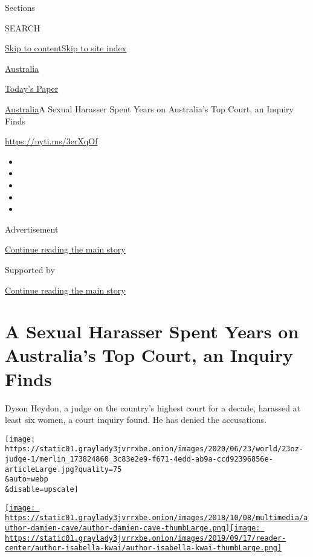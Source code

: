 Sections

SEARCH

\protect\hyperlink{site-content}{Skip to
content}\protect\hyperlink{site-index}{Skip to site index}

\href{https://www.nytimes3xbfgragh.onion/section/world/australia}{Australia}

\href{https://myaccount.nytimes3xbfgragh.onion/auth/login?response_type=cookie\&client_id=vi}{}

\href{https://www.nytimes3xbfgragh.onion/section/todayspaper}{Today's
Paper}

\href{/section/world/australia}{Australia}\textbar{}A Sexual Harasser
Spent Years on Australia's Top Court, an Inquiry Finds

\url{https://nyti.ms/3erXqOf}

\begin{itemize}
\item
\item
\item
\item
\item
\end{itemize}

Advertisement

\protect\hyperlink{after-top}{Continue reading the main story}

Supported by

\protect\hyperlink{after-sponsor}{Continue reading the main story}

\hypertarget{a-sexual-harasser-spent-years-on-australias-top-court-an-inquiry-finds}{%
\section{A Sexual Harasser Spent Years on Australia's Top Court, an
Inquiry
Finds}\label{a-sexual-harasser-spent-years-on-australias-top-court-an-inquiry-finds}}

Dyson Heydon, a judge on the country's highest court for a decade,
harassed at least six women, a court inquiry found. He has denied the
accusations.

\texttt{[image: https://static01.graylady3jvrrxbe.onion/images/2020/06/23/world/23oz-judge-1/merlin\_173824860\_3c83e2e9-f671-4edd-ab9a-ccd92396856e-articleLarge.jpg?quality=75\\\&auto=webp\\\&disable=upscale]}

\href{https://www.nytimes3xbfgragh.onion/by/damien-cave}{\texttt{[image: https://static01.graylady3jvrrxbe.onion/images/2018/10/08/multimedia/author-damien-cave/author-damien-cave-thumbLarge.png]}}\href{https://www.nytimes3xbfgragh.onion/by/isabella-kwai}{\texttt{[image: https://static01.graylady3jvrrxbe.onion/images/2019/09/17/reader-center/author-isabella-kwai/author-isabella-kwai-thumbLarge.png]}}

